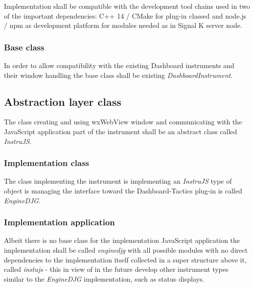 \documentclass[11pt]{article}
\begin{document}
    Implementation shall be compatible with the development tool chains used
in two of the important dependencies: C++ 14 / CMake for plug-in classed
and node.js / npm as development platform for modules needed as in
Signal K server node.

    \hypertarget{base-class}{%
\subsubsection{Base class}\label{base-class}}

    In order to allow compatibility with the existing Dashboard instruments
and their window handling the base class shall be existing
\emph{DashboardInstrument}.

    \hypertarget{abstraction-layer-class}{%
\subsection{Abstraction layer class}\label{abstraction-layer-class}}

    The class creating and using wxWebView window and communicating with the
JavaScript application part of the instrument shall be an abstract class
called \emph{InstruJS}.

    \hypertarget{implementation-class}{%
\subsubsection{Implementation class}\label{implementation-class}}

    The class implementing the instrument is implementing an \emph{InstruJS}
type of object is managing the interface toward the Dashboard-Tactics
plug-in is called \emph{EngineDJG}.

    \hypertarget{implementation-application}{%
\subsubsection{Implementation
application}\label{implementation-application}}

    Albeit there is no base class for the implementation JavaScript
application the implementation shall be called \emph{enginedjg} with all
possible modules with no direct dependencies to the implementation
itself collected in a super structure above it, called \emph{instujs} -
this in view of in the future develop other instrument types similar to
the \emph{EngineDJG} implementation, such as status displays.
\end{document}

